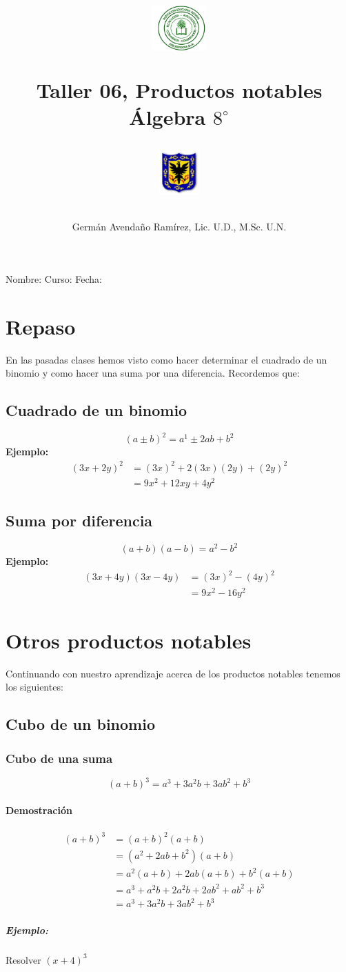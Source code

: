 \documentclass[10pt,twoside]{article}
\author{Germ\'an Avenda\~no Ram\'irez, Lic. U.D., M.Sc. U.N.}
\title{\begin{minipage}{.2\textwidth}
\includegraphics[height=1.75cm]{Images/logo-colegio.png}\end{minipage}
\begin{minipage}{.55\textwidth}
\begin{center}
Taller 06, Productos notables\\
Álgebra $8^{\circ}$
\end{center}
\end{minipage}\hfill
\begin{minipage}{.2\textwidth}
\includegraphics[height=1.75cm]{Images/logo-sed.png} 
\end{minipage}}
\date{}
\begin{document}
\maketitle
Nombre: \hrulefill Curso: \underline{\hspace*{44pt}} Fecha: \underline{\hspace*{2.5cm}}
\section*{Repaso}
En las pasadas clases hemos visto como hacer determinar el cuadrado de un binomio y como hacer una suma por una diferencia. Recordemos que:
\subsection*{Cuadrado de un binomio}
\[(a\pm b)^{2}=a^{1}\pm 2ab+b^{2}\]
\textbf{Ejemplo:}
\begin{align*}
(3x+2y)^{2}&=(3x)^{2}+2(3x)(2y)+(2y)^{2}\\
&=9x^{2}+12xy+4y^{2}
\end{align*}
\subsection*{Suma por diferencia}
\[(a+b)(a-b)=a^{2}-b^{2}\]
\textbf{Ejemplo:}
\begin{align*}
(3x+4y)(3x-4y)&=(3x)^{2}-(4y)^{2}\\
&=9x^{2}-16y^{2}
\end{align*}
\section*{Otros productos notables}
Continuando con nuestro aprendizaje acerca de los productos notables tenemos los siguientes:
\subsection*{Cubo de un binomio}
\subsubsection*{Cubo de una suma}
\[(a+b)^{3}=a^3+3a^2b+3ab^2+b^3\]
\paragraph*{Demostración}
\begin{align*}
(a+b)^{3}&=(a+b)^{2}(a+b)\\
&=(a^{2}+2ab+b^2)(a+b)\\
&=a^2(a+b)+2ab(a+b)+b^2(a+b)\\
&=a^3+a^2b+2a^2b+2ab^2+ab^2+b^3\\
&=a^3+3a^2b+3ab^2+b^3
\end{align*}
\subparagraph*{Ejemplo:} Resolver $(x+4)^3$
\end{document}
